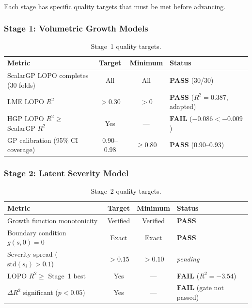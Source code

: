 Each stage has specific quality targets that must be met before advancing.

\subsubsection{Stage 1: Volumetric Growth Models}

\begin{table}[H]
  \centering
  \caption{Stage~1 quality targets.}
  \label{tab:quality_stage1}
  \begin{tabular}{lccl}
    \toprule
    \textbf{Metric} & \textbf{Target} & \textbf{Minimum} &
      \textbf{Status} \\
    \midrule
    ScalarGP LOPO completes (30 folds) & All & All & \textbf{PASS} (30/30) \\
    LME LOPO $R^2$ & $> 0.30$ & $> 0$ & \textbf{PASS} ($R^2 = 0.387$, adapted) \\
    HGP LOPO $R^2 \geq$ ScalarGP $R^2$ & Yes & --- & \textbf{FAIL} ($-0.086 < -0.009$) \\
    GP calibration (95\% CI coverage) & 0.90--0.98 & $\geq 0.80$ & \textbf{PASS} (0.90--0.93) \\
    \bottomrule
  \end{tabular}
\end{table}

\subsubsection{Stage 2: Latent Severity Model}

\begin{table}[H]
  \centering
  \caption{Stage~2 quality targets.}
  \label{tab:quality_stage2}
  \begin{tabular}{lccl}
    \toprule
    \textbf{Metric} & \textbf{Target} & \textbf{Minimum} &
      \textbf{Status} \\
    \midrule
    Growth function monotonicity & Verified & Verified & \textbf{PASS} \\
    Boundary condition $g(s, 0) = 0$ & Exact & Exact & \textbf{PASS} \\
    Severity spread ($\text{std}(s_i) > 0.1$) & $> 0.15$ & $> 0.10$ & \textit{pending} \\
    LOPO $R^2 \geq$ Stage~1 best & Yes & --- & \textbf{FAIL} ($R^2 = -3.54$) \\
    $\Delta R^2$ significant ($p < 0.05$) & Yes & --- & \textbf{FAIL} (gate not passed) \\
    \bottomrule
  \end{tabular}
\end{table}


